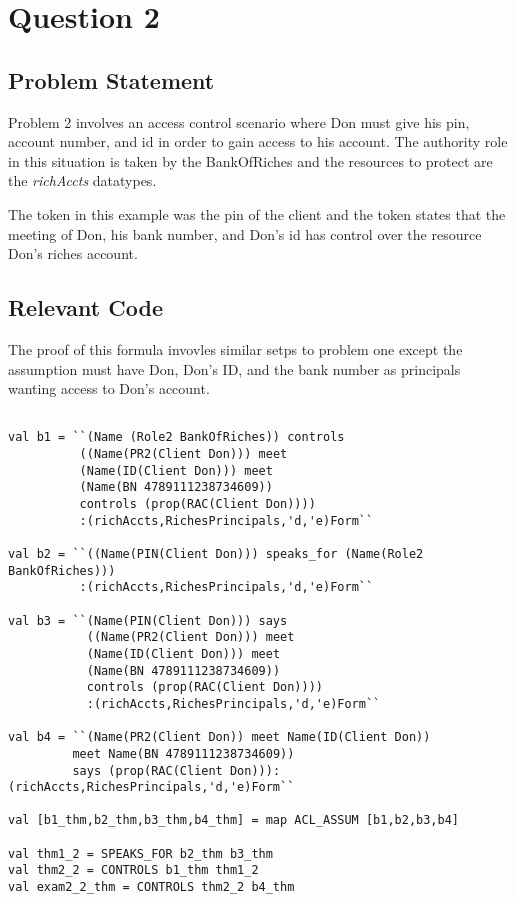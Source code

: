 \documentclass[11pt, twoside]{article}
\begin{document}
\newpage

\section{Question 2}
\label{sec:question-2}

\subsection{Problem Statement}
\label{sec:problem-statement-4}

Problem 2 involves an access control scenario where Don must give his pin, account number, and id
in order to gain access to his account. The authority role in this situation is taken by the BankOfRiches and
the resources to protect are the \textit{richAccts} datatypes.

The token in this example was the pin of the client and the token states that the meeting of Don, his bank number,
and Don's id has control over the resource Don's riches account. 




\subsection{Relevant Code}
\label{sec:relevant-code-1}

The proof of this formula invovles similar setps to problem one except the assumption must have
Don, Don's ID, and the bank number as principals wanting access to Don's account.

\lstset{frameround=fftt}
\begin{lstlisting}

val b1 = ``(Name (Role2 BankOfRiches)) controls
          ((Name(PR2(Client Don))) meet
	   	  (Name(ID(Client Don))) meet
	   	  (Name(BN 4789111238734609))
          controls (prop(RAC(Client Don))))
		  :(richAccts,RichesPrincipals,'d,'e)Form``

val b2 = ``((Name(PIN(Client Don))) speaks_for (Name(Role2 BankOfRiches)))
          :(richAccts,RichesPrincipals,'d,'e)Form``

val b3 = ``(Name(PIN(Client Don))) says 
           ((Name(PR2(Client Don))) meet
	   	   (Name(ID(Client Don))) meet
	   	   (Name(BN 4789111238734609))
		   controls (prop(RAC(Client Don))))
		   :(richAccts,RichesPrincipals,'d,'e)Form``

val b4 = ``(Name(PR2(Client Don)) meet Name(ID(Client Don)) 
         meet Name(BN 4789111238734609)) 
	   	 says (prop(RAC(Client Don))):(richAccts,RichesPrincipals,'d,'e)Form``

val [b1_thm,b2_thm,b3_thm,b4_thm] = map ACL_ASSUM [b1,b2,b3,b4]

val thm1_2 = SPEAKS_FOR b2_thm b3_thm
val thm2_2 = CONTROLS b1_thm thm1_2
val exam2_2_thm = CONTROLS thm2_2 b4_thm

\end{lstlisting}
\end{document}
